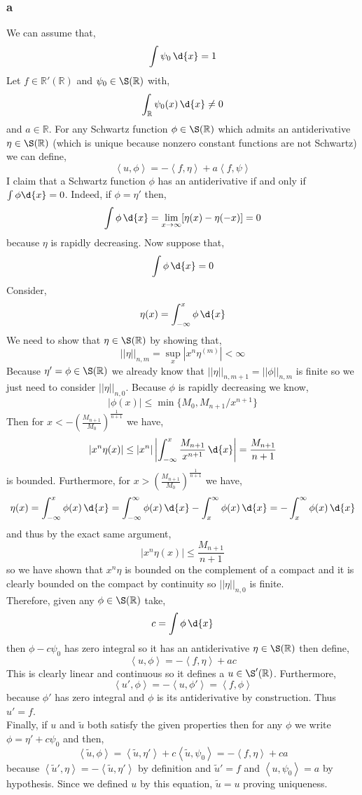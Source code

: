 \documentclass[12pt]{article}
\newcommand{\inner}[2]{\left< #1, #2 \right>}
\newcommand{\R}{\mathbb{R}}
\begin{document}
\subsubsection{a}
We can assume that,
\[ \int \psi_0 \, \d{x} = 1 \]
Let $f \in \R'(\R)$ and $\psi_0 \in \S(\R)$ with,
\[ \int_\R \psi_0(x) \, \d{x} \neq 0 \]
and $a \in \R$. For any Schwartz function $\phi \in \S(\R)$ which admits an antiderivative $\eta \in \S(\R)$ (which is unique because nonzero constant functions are not Schwartz) we can define,
\[ \inner{u}{\phi} = - \inner{f}{\eta} + a \inner{f}{\psi} \]
I claim that a Schwartz function $\phi$ has an antiderivative if and only if $\int \phi \d{x} = 0$. Indeed, if $\phi = \eta'$ then,
\[ \int \phi \, \d{x} = \lim_{x \to \infty} [\eta(x) - \eta(-x)] = 0 \]
because $\eta$ is rapidly decreasing. Now suppose that,
\[ \int \phi \, \d{x} = 0 \]
Consider,
\[ \eta(x) = \int_{-\infty}^x \phi \, \d{x} \]
We need to show that $\eta \in \S(\R)$ by showing that,
\[ || \eta ||_{n,m} = \sup_x | x^n \eta^{(m)} | < \infty \]
Because $\eta' = \phi \in \S(\R)$ we already know that $|| \eta ||_{n, m+1} = || \phi ||_{n,m}$ is finite so we just need to consider $|| \eta ||_{n,0}$. Because $\phi$ is rapidly decreasing we know,
\[ |\phi(x)| \le \min \{ M_0, M_{n+1} / x^{n+1} \} \]
Then for $x < - \left( \frac{M_{n+1}}{M_0} \right)^{\frac{1}{n+1}}$ we have,
\[ | x^n \eta(x) | \le |x^n| \left| \int_{-\infty}^x \frac{M_{n+1}}{x^{n+1}} \, \d{x} \right| = \frac{M_{n+1}}{n+1} \]
is bounded. Furthermore, for $x > \left( \frac{M_{n+1}}{M_0} \right)^{\frac{1}{n+1}}$ we have,
\[ \eta(x) = \int_{-\infty}^x \phi(x) \, \d{x} = \int_{-\infty}^{\infty}  \phi(x) \, \d{x} - \int_x^{\infty} \phi(x) \, \d{x} = - \int_x^{\infty} \phi(x) \, \d{x} \]
and thus by the exact same argument,
\[ | x^n \eta(x) | \le \frac{M_{n+1}}{n+1} \]
so we have shown that $x^n \eta$ is bounded on the complement of a compact and it is clearly bounded on the compact by continuity so $|| \eta ||_{n,0}$ is finite. 
\bigskip\\
Therefore, given any $\phi \in \S(\R)$ take,
\[  c = \int \phi \, \d{x} \]
then $\phi - c \psi_0$ has zero integral so it has an antiderivative $\eta \in \S(\R)$ then define,
\[ \inner{u}{\phi} = - \inner{f}{\eta} + a c \]
This is clearly linear and continuous so it defines a $u \in \S'(\R)$. Furthermore, 
\[ \inner{u'}{\phi} = - \inner{u}{\phi'} = \inner{f}{\phi} \]
because $\phi'$ has zero integral and $\phi$ is its antiderivative by construction. Thus $u' = f$.
\bigskip\\
Finally, if $u$ and $\tilde{u}$ both satisfy the given properties then for any $\phi$ we write $\phi = \eta' + c \psi_0$ and then,
\[ \inner{\tilde{u}}{\phi} = \inner{\tilde{u}}{\eta'} + c \inner{\tilde{u}}{\psi_0} = - \inner{f}{\eta} + c a \]
because $\inner{\tilde{u}'}{\eta} = - \inner{\tilde{u}}{\eta'}$ by definition and $\tilde{u}' = f$ and $\inner{u}{\psi_0} = a$ by hypothesis. Since we defined $u$ by this equation, $\tilde{u} = u$ proving uniqueness.
\end{document}
